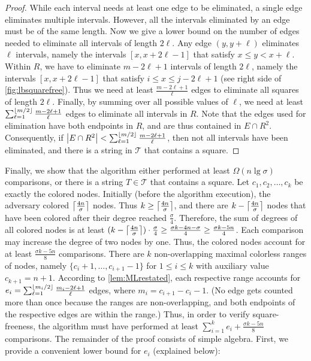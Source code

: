 \begin{proof}
While each interval needs at least one edge to be eliminated, a single edge eliminates multiple intervals. 
However, all the intervals eliminated by an edge must be of the same length.
Now we give a lower bound on the number of edges needed to eliminate all intervals of length $2\ell$.
Any edge $(y, y + \ell)$ eliminates $\ell$ intervals, namely the intervals $[x,x+2\ell-1]$ that satisfy $x \leq y < x + \ell$. Within $R$, we have to eliminate $m - 2\ell + 1$ intervals of length $2\ell$, namely the intervals $[x,x+2\ell-1]$ that satisfy $i \leq x \leq j - 2\ell + 1$ (see right side of \cref{fig:lbsquarefree}). Thus we need at least $\frac{m - 2\ell + 1}{\ell}$ edges to eliminate all squares of length $2\ell$.
Finally, by summing over all possible values of $\ell$, we need at least $\sum_{\ell = 1}^{\left\lfloor m / 2\right\rfloor} \frac{m - 2\ell + 1}{\ell}$ edges to eliminate all intervals in $R$.
Note that the edges used for elimination have both endpoints in $R$, and are thus contained in $E \cap R^2$.
Consequently, if $\left\lvert E \cap R^2\right\rvert < \sum_{\ell = 1}^{\left\lfloor m / 2\right\rfloor} \frac{m - 2\ell + 1}{\ell}$, then not all intervals have been eliminated, and there is a string in $\mathcal T$ that contains a square.
\end{proof}

Finally, we show that the algorithm either performed at least $\Omega(n \lg \sigma)$ comparisons, or there is a string $T \in \mathcal T$ that contains a square.
Let $c_1, c_2, \dots, c_k$ be exactly the colored nodes. Initially (before the algorithm execution), the adversary colored $\left\lceil\frac {4n} \sigma\right\rceil$ nodes. Thus $k \geq \left\lceil\frac {4n} \sigma\right\rceil$, and there are $k - \left\lceil\frac {4n} \sigma\right\rceil$ nodes that have been colored after their degree reached $\frac \sigma 4$. Therefore, the sum of degrees of all colored nodes is at least $(k - \left\lceil\frac {4n} \sigma\right\rceil) \cdot \frac \sigma 4 \geq \frac{\sigma k - 4n - \sigma}{4} \geq \frac{\sigma k - 5n}{4}$. Each comparison may increase the degree of two nodes by one. Thus, the colored nodes account for at least $\frac{\sigma k - 5n}{8}$ comparisons.
There are $k$ non-overlapping maximal colorless ranges of nodes, namely $\{c_i + 1, \dots, c_{i + 1} - 1\}$ for $1 \leq i \leq k$ with auxiliary value $c_{k + 1} = n + 1$. According to \cref{lem:MLrestated}, each respective range accounts for $e_i = \sum_{\ell = 1}^{\left\lfloor m_i / 2\right\rfloor} \frac{m_i - 2\ell + 1}{\ell}$ edges, where $m_i = c_{i + 1} - c_i - 1$. (No edge gets counted more than once because the ranges are non-overlapping, and both endpoints of the respective edges are within the range.)
Thus, in order to verify square-freeness, the algorithm must have performed at least $\sum_{i = 1}^k e_i + \frac{\sigma k - 5n}{8}$ comparisons. 
The remainder of the proof consists of simple algebra. First, we provide a convenient lower bound for $e_i$ (explained below):%
%

